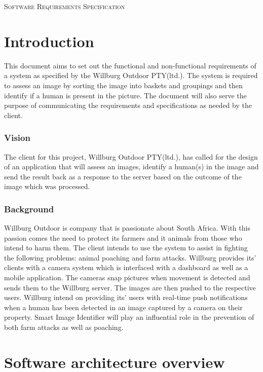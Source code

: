 \documentclass[a4paper,12pt]{report}
\begin{document}
\renewcommand{\thesection}{\arabic{section}}
\newpage
\tableofcontents
\newpage
\begin{center}
\textsc{\LARGE Software Requirements Specification}\\[1.5cm]
\end{center}

\section{Introduction}
This document aims to set out the functional and non-functional requirements of a system as specified by the Willburg Outdoor PTY(ltd.). The system is required to assess an image by sorting the image into baskets and groupings and then identify if a human is present in the picture. The document will also serve the purpose of communicating the requirements and specifications as needed by the client.

 \subsubsection{Vision}
 The client for this project, Willburg Outdoor PTY(ltd.), has called for the design of an application that will assess an images, identify a human(s) in the image and send the result back as a response to the server based on the outcome of the image which was processed.

\subsubsection{Background}\hfill \break
Willburg Outdoor is company that is passionate about South Africa. With this passion comes the need to protect its farmers and it animals from those who intend to harm them. The client intends to use the system to assist in fighting the following problems: animal poaching and farm attacks. 
Willburg provides its' clients with a camera system which is interfaced with a dashboard as well as a mobile application. The cameras snap pictures when movement is detected and sends them to the Willburg server. The images are then pushed to the respective users. Willburg intend on providing its' users with real-time push notifications when a human has been detected in an image captured by a camera on their property. Smart Image Identifier will play an influential role in the prevention of both farm attacks as well as poaching.
\newpage
\section {Software architecture overview}
\end{document}
